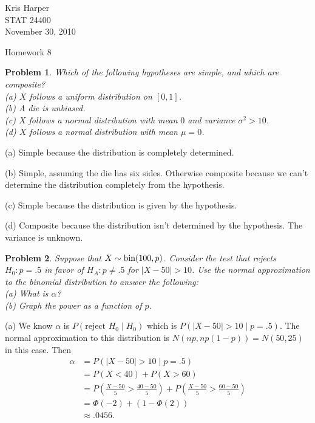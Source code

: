 \documentclass{article}
\newtheorem{problem}{Problem}
\begin{document}
\begin{flushright}
Kris Harper\\

STAT 24400\\

November 30, 2010
\end{flushright}

\begin{center}
Homework 8
\end{center}

\begin{problem}
Which of the following hypotheses are simple, and which are composite?\\
(a) $X$ follows a uniform distribution on $[0,1]$.\\
(b) A die is unbiased.\\
(c) $X$ follows a normal distribution with mean $0$ and variance $\sigma^2 > 10$.\\
(d) $X$ follows a normal distribution with mean $\mu = 0$.
\end{problem}

(a) Simple because the distribution is completely determined.

(b) Simple, assuming the die has six sides. Otherwise composite because we can't determine the distribution completely from the hypothesis.

(c) Simple because the distribution is given by the hypothesis.

(d) Composite because the distribution isn't determined by the hypothesis. The variance is unknown.

\begin{problem}
Suppose that $X \sim \textup{bin}(100,p)$. Consider the test that rejects $H_0 : p = .5$ in favor of $H_A : p \neq .5$ for $|X - 50| > 10$. Use the normal approximation to the binomial distribution to answer the following:\\
(a) What is $\alpha$?\\
(b) Graph the power as a function of $p$.
\end{problem}

(a) We know $\alpha$ is $P(\text{reject } H_0 \mid H_0)$ which is $P(|X - 50| > 10 \mid p = .5)$. The normal approximation to this distribution is $N(np, np(1-p)) = N(50,25)$ in this case. Then
\begin{align*}
\alpha
&= P(|X - 50| > 10 \mid p = .5)\\
&= P(X < 40) + P(X > 60)\\
&= P \left ( \frac{X - 50}{5} > \frac{40-50}{5} \right ) + P \left ( \frac{X - 50}{5} > \frac{60-50}{5} \right )\\
&= \Phi(-2) + (1 - \Phi(2))\\
&\approx .0456.
\end{align*}
\end{document}
